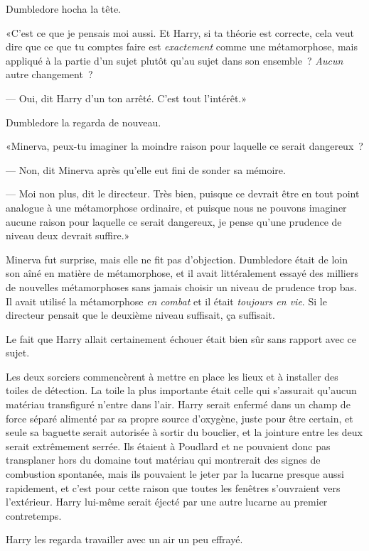 Dumbledore hocha la tête.

«C'est ce que je pensais moi aussi. Et Harry, si ta théorie est correcte, cela veut dire que ce que tu comptes faire est \emph{exactement} comme une métamorphose, mais appliqué à la partie d'un sujet plutôt qu'au sujet dans son ensemble~? \emph{Aucun} autre changement~?

--- Oui, dit Harry d'un ton arrêté. C'est tout l'intérêt.»

Dumbledore la regarda de nouveau.

«Minerva, peux-tu imaginer la moindre raison pour laquelle ce serait dangereux~?

--- Non, dit Minerva après qu'elle eut fini de sonder sa mémoire.

--- Moi non plus, dit le directeur. Très bien, puisque ce devrait être en tout point analogue à une métamorphose ordinaire, et puisque nous ne pouvons imaginer aucune raison pour laquelle ce serait dangereux, je pense qu'une prudence de niveau deux devrait suffire.»

Minerva fut surprise, mais elle ne fit pas d'objection. Dumbledore était de loin son aîné en matière de métamorphose, et il avait littéralement essayé des milliers de nouvelles métamorphoses sans jamais choisir un niveau de prudence trop bas. Il avait utilisé la métamorphose \emph{en combat} et il était \emph{toujours en vie}. Si le directeur pensait que le deuxième niveau suffisait, ça suffisait.

Le fait que Harry allait certainement échouer était bien sûr sans rapport avec ce sujet.

Les deux sorciers commencèrent à mettre en place les lieux et à installer des toiles de détection. La toile la plus importante était celle qui s'assurait qu'aucun matériau transfiguré n'entre dans l'air. Harry serait enfermé dans un champ de force séparé alimenté par sa propre source d'oxygène, juste pour être certain, et seule sa baguette serait autorisée à sortir du bouclier, et la jointure entre les deux serait extrêmement serrée. Ils étaient à Poudlard et ne pouvaient donc pas transplaner hors du domaine tout matériau qui montrerait des signes de combustion spontanée, mais ils pouvaient le jeter par la lucarne presque aussi rapidement, et c'est pour cette raison que toutes les fenêtres s'ouvraient vers l'extérieur. Harry lui-même serait éjecté par une autre lucarne au premier contretemps.

Harry les regarda travailler avec un air un peu effrayé.


